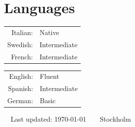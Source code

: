\documentclass[11pt]{article} %
\begin{document}

\section*{Languages}\startseclist

\begin{minipage}[t]{.45\textwidth}
\begin{tabular}{rl}
Italian: & Native\\
Swedish: & Intermediate\\
French: & Intermediate\\
\end{tabular}
\end{minipage}%
\begin{minipage}[t]{.45\textwidth}
\begin{tabular}{rl}
English: & Fluent\\
Spanish: & Intermediate\\
German: & Basic\\
\end{tabular}
\end{minipage}


\begin{center}
	\scriptsize
	\raisebox{-0.5pt}{\textbullet}~~Last updated: \today~~\raisebox{-0.5pt}{\textbullet}~~Stockholm~~\raisebox{-0.5pt}{\textbullet}
\end{center}
\end{document}
